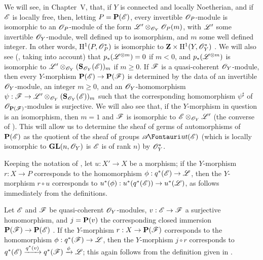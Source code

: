\begin{remark}[4.2.7]
\label{II.4.2.7}
We will see, in Chapter~V, that, if $Y$ is connected and locally Noetherian, and if $\mathscr{E}$ is locally free, then, letting $P=\mathbf{P}(\mathscr{E})$, every invertible $\mathscr{O}_P$-module is isomorphic to an $\mathscr{O}_P$-module of the form $\mathscr{L}'\otimes_{\mathscr{O}_Y}\mathscr{O}_P(m)$, with $\mathscr{L}'$ some invertible $\mathscr{O}_Y$-module, well defined up to isomorphism, and $m$ some well defined integer.
In other words, $\mathrm{H}^1(P,\mathscr{O}_P^*)$ is isomorphic to $\mathbf{Z}\times\mathrm{H}^1(Y,\mathscr{O}_Y^*)$ .
We will also see (, taking  into account) that $p_*(\mathscr{L}^{\otimes m})=0$ if $m<0$, and $p_*(\mathscr{L}^{\otimes m})$ is isomorphic to $\mathscr{L}'\otimes_{\mathscr{O}_Y}(\mathbf{S}_{\mathscr{O}_Y}(\mathscr{E}))_m$ if $m\geq0$.
If $\mathscr{F}$ is a quasi-coherent $\mathscr{O}_Y$-module, then every $Y$-morphism $\bb{P}(\sh{E})\to\bb{P}(\sh{F})$ is determined by the data of an invertible $\mathscr{O}_Y$-module, an integer $m\geq0$, and an $\mathscr{O}_Y$-homomorphism $\psi:\sh{F}\to\sh{L}'\otimes_{\sh{O}_Y}(\bb{S}_{\sh{O}_Y}(\sh{E}))_m$ such that the corresponding homomorphism $\psi^\sharp$ of $\mathscr{O}_{\mathbf{P}(\mathscr{F})}$-modules is surjective.
We will also see that, if the $Y$-morphism in question is an isomorphism, then $m=1$ and $\mathscr{F}$ is isomorphic to $\mathscr{E}\otimes_{\mathscr{O}_Y}\mathscr{L}'$ (the converse of ).
This will allow us to determine the sheaf of germs of automorphisms of $\mathbf{P}(\mathscr{E})$ as the quotient of the sheaf of groups $\shAut(\sh{E})$ (which is locally isomorphic to $\mathbf{GL}(n,\mathscr{O}_Y)$ is $\mathscr{E}$ is of rank $n$) by $\mathscr{O}_Y^*$.
\end{remark}

\begin{env}[4.2.8]
\label{II.4.2.8}
Keeping the notation of , let $u:X'\to X$ be a morphism;
if the $Y$-morphism $r:X\to P$ corresponds to the homomorphism $\vphi:q^*(\sh{E})\to\sh{L}$, then the $Y$-morphism $r\circ u$ corresponds to $u^*(\vphi):u^*(q^*(\sh{E}))\to u^*(\sh{L})$, as follows immediately from the definitions.
\end{env}

\begin{env}[4.2.9]
\label{II.4.2.9}
Let $\mathscr{E}$ and $\mathscr{F}$ be quasi-coherent $\mathscr{O}_Y$-modules, $v:\sh{E}\to\sh{F}$ a surjective homomorphism, and $j=\mathbf{P}(v)$ the corresponding closed immersion $\bb{P}(\sh{F})\to\bb{P}(\sh{E})$ .
If the $Y$-morphism $r:X\to\bb{P}(\sh{F})$ corresponds to the homomorphism $\vphi:q^*(\sh{F})\to\sh{L}$, then the
$Y$-morphism $j\circ r$ corresponds to $q^*(\mathscr{E})\xrightarrow{q^*(v)}q^*(\mathscr{F})\xrightarrow{\phi}\mathscr{L}$;
this again follows from the definition given in .
\end{env}

